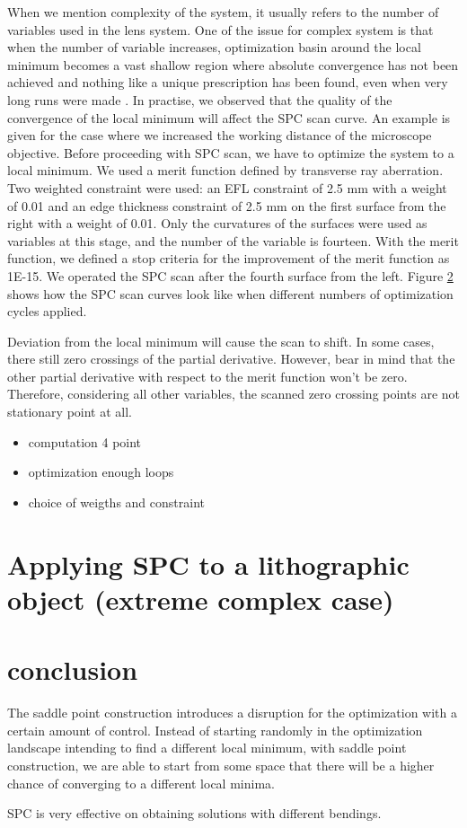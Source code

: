When we mention complexity of the system, it usually refers to the number of variables used in the lens system. One of the issue for complex system is that when the number of variable increases, optimization basin around the local minimum becomes a vast shallow region where absolute convergence has not been achieved and nothing like a unique prescription has been found, even when very long runs were made \cite{Brixner81}. In practise, we observed that the quality of the convergence of the local minimum will affect the SPC scan curve. An example is given for the case where we increased the working distance of the microscope objective. Before proceeding with SPC scan, we have to optimize the system to a local minimum. We used a merit function defined by transverse ray aberration. Two weighted constraint were used: an EFL constraint of 2.5 mm with a weight of 0.01 and an edge thickness constraint of 2.5 mm on the first surface from the right with a weight of 0.01. Only the curvatures of the surfaces were used as variables at this stage, and the number of the variable is fourteen. With the merit function, we defined a stop criteria for the improvement of the merit function as 1E-15. We operated the SPC scan after the fourth surface from the left. Figure \ref{} shows how the SPC scan curves look like when different numbers of optimization cycles applied. 




Deviation from the local minimum will cause the scan to shift. In some cases, there still zero crossings of the partial derivative. However, bear in mind that the other partial derivative with respect to the merit function won't be zero. Therefore, considering all other variables, the scanned zero crossing points are not stationary point at all. 

\begin{itemize}
\item computation 4 point
\item optimization enough loops
\item choice of weigths and constraint
\end{itemize}


\section{Applying SPC to a lithographic object (extreme complex case)}


\section{conclusion}

The saddle point construction introduces a disruption for the optimization with a certain amount of control. Instead of starting randomly in the optimization landscape intending to find a different local minimum, with saddle point construction, we are able to start from some space that there will be a higher chance of converging to a different local minima. 

SPC is very effective on obtaining solutions with different bendings. 


